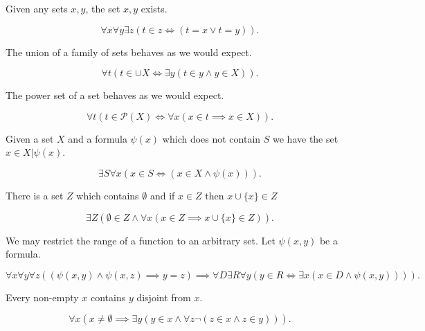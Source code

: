 \documentclass[]{article}
\begin{document}
\begin{axiom} [Pairing]
		Given any sets $x, y$, the set ${x,y}$ exists.

		\[
				\forall x \forall y \exists z (t \in z \iff (t = x \lor t = y))
		.\] 
\end{axiom}

\begin{axiom} [Union]
	The union of a family of sets behaves as we would expect.

	\[
			\forall t (t \in \cup X \iff \exists y (t \in y \land y \in X))	
	.\] 
\end{axiom}

\begin{axiom} 
	The power set of a set behaves as we would expect.

	\[
			\forall t (t \in \mathcal{P}(X) \iff \forall x (x \in t \implies x \in X))			
	.\] 
\end{axiom}

\begin{axiom} [Separation]
		Given a set $X$ and a formula $\psi(x)$	which does not contain $S$ we have the set ${x \in X | \psi(x)}$.

		 \[
				 \exists S \forall x (x \in S \iff (x \in X \land \psi(x)))
		.\] 
\end{axiom}

\begin{axiom} [Infinity]
		There is a set $Z$ which contains $\emptyset$ and if $x \in Z$ then $x \cup \{x\} \in Z$	

		\[
				\exists Z(\emptyset \in Z \land \forall x(x \in Z \implies x \cup \{x\} \in Z))
		.\] 
\end{axiom}

\begin{axiom} [Replacement]
	We may restrict the range of a function to an arbitrary set.
	Let $\psi(x,y)$ be a formula.

	\[
			\forall x \forall y \forall z ((\psi(x,y) \land \psi(x,z) \implies y = z) \implies \forall D \exists R \forall y (y \in R \iff \exists x (x \in D \land \psi(x,y))))
	.\] 
\end{axiom}

\begin{axiom} [Regularity]
	Every non-empty $x$ contains $y$ disjoint from $x$.

	\[
			\forall x (x \neq \emptyset \implies \exists y (y \in x \land \forall z \lnot (z \in x \land z \in y)))
	.\] 
\end{axiom}
\end{document}
